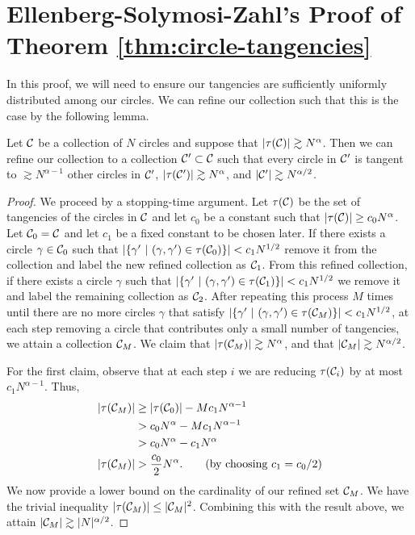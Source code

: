 \section[Ellenberg-Solymosi-Zahl's Proof]{Ellenberg-Solymosi-Zahl's Proof of Theorem \ref{thm:circle-tangencies}}
In this proof, we will need to ensure our tangencies
are sufficiently uniformly distributed among our circles. We can refine our collection such that this is the case by the following lemma.

\begin{lemma}
    Let $\mathcal C$ be a collection of $N$ circles and suppose that $|\tau(\mathcal C)| \gtrsim N^{\alpha}$. 
    Then we can refine our collection to a collection $\mathcal C' \subset \mathcal C$ such that every circle in $\mathcal C'$ is tangent to $\gtrsim N^{\alpha -1}$ other circles in $\mathcal C'$, $|\tau(\mathcal C')| \gtrsim N^{\alpha}$, and $|\mathcal C'| \gtrsim N^{\alpha/2}$. \label{lem:uniform-refine}
\end{lemma}

\begin{proof}
We proceed by a stopping-time argument.
Let $\tau(\mathcal C)$ be the set of tangencies of the circles in $\mathcal C$ and let $c_0$ be a constant such that $|\tau(\mathcal C)| \geq c_0 N^{\alpha}$. Let $\mathcal C_0 = \mathcal C$ and let $c_1$ be a fixed constant to be chosen later. If there exists a circle $\gamma \in \mathcal C_0$ such that $|\{ \gamma' \ |\ (\gamma, \gamma') \in \tau(\mathcal C_0)\}| < c_1 N^{1/2}$
remove it from the collection and label the new refined collection as $\mathcal C_1$. From this refined collection, if there exists a circle $\gamma$ such that $|\{\gamma'\ |\ (\gamma, \gamma') \in \tau(\mathcal C_1)\}| < c_1 N^{1/2}$ we remove it and label the remaining collection as $\mathcal C_2$.
After repeating this process $M$ times until there are no more circles $\gamma$ that satisfy $|\{\gamma'\ |\ (\gamma, \gamma') \in \tau(\mathcal C_M)\}| < c_1 N^{1/2}$, at each step removing a circle that contributes only a small number of tangencies, we attain a collection $\mathcal C_M$.
 We claim that $|\tau(\mathcal C_M)| \gtrsim N^{\alpha}$, and that $|\mathcal C_M| \gtrsim N^{\alpha/2}$.

For the first claim, observe that at each step $i$ we are reducing $\tau(\mathcal C_i)$ by at most $c_1 N^{\alpha -1}$.  Thus,
\begin{align*}
    |\tau(\mathcal C_M)| &\geq |\tau(\mathcal C_0)| - M c_1 N^{\alpha -1} \\
    &> c_0 N^{\alpha} -  M c_1 N^{\alpha -1} \\ 
    &> c_0 N^{\alpha} - c_1 N^{\alpha} \\
    |\tau(\mathcal C_M)| &> \frac{c_0}{2} N^{\alpha}. \qquad (\text{by choosing } c_1 = c_0/2 )
\end{align*}
We now provide a lower bound on the cardinality of our refined set $\mathcal C_M$. We have the trivial inequality $|\tau(\mathcal C_M)| \leq |\mathcal C_M|^{2}$. 
Combining this with the result above, we attain $|\mathcal C_M| \gtrsim |N|^{\alpha/2}$.
\end{proof}

